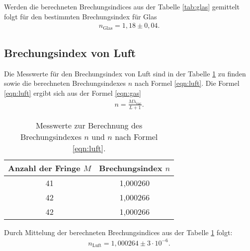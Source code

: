 Werden die berechneten Brechungsindices aus der Tabelle \ref{tab:glas} gemittelt folgt für den
bestimmten Brechungsindex für Glas
\begin{align*}
  n_\mathrm{Glas}=1,18\pm0,04.
\end{align*}


\subsection{Brechungsindex von Luft}
Die Messwerte für den Brechungsindex von Luft sind in der Tabelle \ref{tab:luft}
zu finden sowie die berechneten Brechungsindexes $n$ nach Formel \eqref{eqn:luft}.
Die Formel \eqref{eqn:luft} ergibt sich aus der Formel \eqref{eqn:gas}
\begin{align}%
    n=\frac{M\lambda_\mathrm{vac}}{L+1} \label{eqn:luft}.
\end{align}

\begin{table}
\centering
\caption{Messwerte zur Berechnung des Brechungsindexes $n$ und $n$ nach Formel \eqref{eqn:luft}.}
\label{tab:luft}
\begin{tabular}{c c}
\toprule
  Anzahl der Fringe $M$ & Brechungsindex $n$ \\
\midrule
41 &  1,000260\\
42 &  1,000266\\
42 &  1,000266\\
\bottomrule
\end{tabular}
\end{table}
Durch Mittelung der berechneten Brechungsindices aus der Tabelle \ref{tab:luft}
folgt:
\begin{align*}
  n_\mathrm{Luft}=1,000264\pm 3\cdot10^{-6}.
\end{align*}
